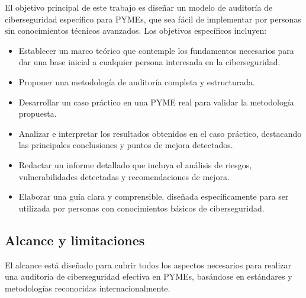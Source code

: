 \documentclass[a4paper, 11pt]{article}
\begin{document}
El objetivo principal de este trabajo es diseñar un modelo de auditoría de ciberseguridad específico para PYMEs, que sea fácil de implementar por personas sin conocimientos técnicos avanzados. Los objetivos específicos incluyen:

\begin{itemize}
    \item Establecer un marco teórico que contemple los fundamentos necesarios para dar una base inicial a cualquier persona interesada en la ciberseguridad.
    \item Proponer una metodología de auditoría completa y estructurada.
    \item Desarrollar un caso práctico en una PYME real para validar la metodología propuesta.
    \item Analizar e interpretar los resultados obtenidos en el caso práctico, destacando las principales conclusiones y puntos de mejora detectados.

    \item Redactar un informe detallado que incluya el análisis de riesgos, vulnerabilidades detectadas y recomendaciones de mejora.
    \item Elaborar una guía clara y comprensible, diseñada específicamente para ser utilizada por personas con conocimientos básicos de ciberseguridad.
\end{itemize}

\subsection{Alcance y limitaciones}


El alcance está diseñado para cubrir todos los aspectos necesarios para realizar una auditoría de ciberseguridad efectiva en PYMEs, basándose en estándares y metodologías reconocidas internacionalmente.
\end{document}
